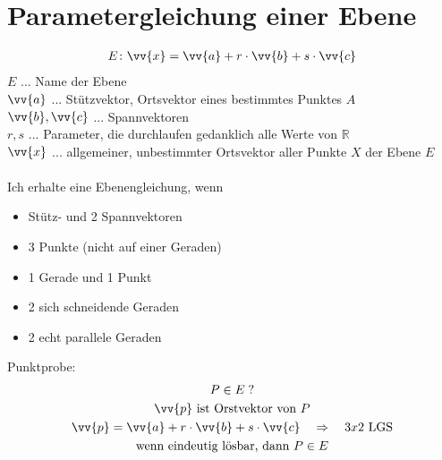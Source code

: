 \section{Parametergleichung einer Ebene}
\begin{gather*}
  E \colon \vv{x} = \vv{a} + r \cdot \vv{b} + s \cdot \vv{c}
\end{gather*}
$E$ ... Name der Ebene \\
$\vv{a}$ ... Stützvektor, Ortsvektor eines bestimmtes Punktes $A$ \\
$\vv{b}, \vv{c}$ ... Spannvektoren \\
$r, s$ ... Parameter, die durchlaufen gedanklich alle Werte von $\mathbb{R}$ \\
$\vv{x}$ ... allgemeiner, unbestimmter Ortsvektor aller Punkte $X$ der Ebene $E$ \\\\
Ich erhalte eine Ebenengleichung, wenn
\begin{itemize}
  \item Stütz- und 2 Spannvektoren
  \item 3 Punkte (nicht auf einer Geraden)
  \item 1 Gerade und 1 Punkt
  \item 2 sich schneidende Geraden
  \item 2 echt parallele Geraden
\end{itemize}
Punktprobe:
\begin{gather*}
  P \in E \; ? \\
  \text{$\vv{p}$ ist Orstvektor von $P$} \\
  \vv{p} = \vv{a} + r \cdot \vv{b} + s \cdot \vv{c} \quad\Rightarrow\quad \text{$3x2$ LGS} \\
  \text{wenn eindeutig lösbar, dann $P \in E$}
\end{gather*}
